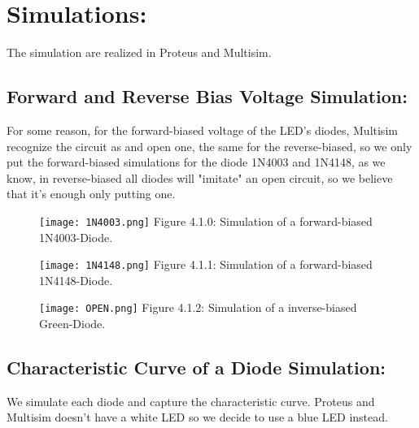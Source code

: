 \documentclass[10pt,a4paper]{article}
\begin{document}
\pagebreak

\section{Simulations:}

The simulation are realized in Proteus and Multisim.

\subsection{Forward and Reverse Bias Voltage Simulation:}

For some reason, for the forward-biased voltage of the LED's diodes, Multisim recognize the circuit as and open one, the same for the reverse-biased, so we only put the forward-biased simulations for the diode 1N4003 and 1N4148, as we know, in reverse-biased all diodes will "imitate" an open circuit, so we believe that it's enough only putting one.

\begin{figure}[H]
\texttt{[image: 1N4003.png]}
\centering \linebreak \linebreak Figure 4.1.0: Simulation of a forward-biased 1N4003-Diode.
\end{figure}

\begin{figure}[H]
\texttt{[image: 1N4148.png]}
\centering \linebreak \linebreak Figure 4.1.1: Simulation of a forward-biased 1N4148-Diode.
\end{figure}

\begin{figure}[H]
\texttt{[image: OPEN.png]}
\centering \linebreak \linebreak Figure 4.1.2: Simulation of a inverse-biased Green-Diode.
\end{figure}

\pagebreak

\subsection{Characteristic Curve of a Diode Simulation:}

We simulate each diode and capture the characteristic curve. Proteus and Multisim doesn't have a white LED so we decide to use a blue LED instead.
\end{document}
